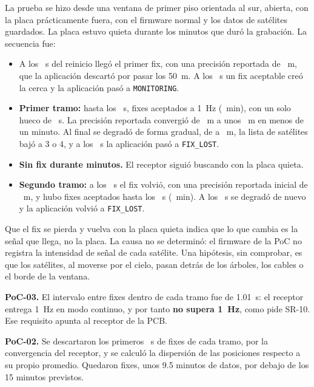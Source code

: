 La prueba se hizo desde una ventana de primer piso orientada al sur, abierta, con la placa prácticamente
fuera, con el firmware normal y los datos de satélites guardados. La placa estuvo quieta durante los
\dStaticRecordingMinutes{} minutos que duró la grabación. La secuencia fue:

\begin{itemize}
  \item A los \dStaticFirstFixS~s del reinicio llegó el primer fix, con una precisión reportada de
        \dStaticFirstFixAcc~m, que la aplicación descartó por pasar los 50~m. A los \dStaticFenceS~s un
        fix aceptable creó la cerca y la aplicación pasó a \texttt{MONITORING}.
  \item \textbf{Primer tramo:} hasta los \dStaticRunOneEndS~s, \dStaticRunOneFixes{} fixes aceptados a 1~Hz
        (\dStaticRunOneMinutes~min), con un solo hueco de \dStaticMaxGapS~s. La precisión reportada
        convergió de \dStaticAccStart~m a unos \dStaticAccConverged~m en menos de un minuto. Al final se
        degradó de forma gradual, de \dStaticTailAccFrom{} a \dStaticTailAccTo~m, la lista de satélites bajó a
        3 o 4, y a los \dStaticLostFirstS~s la aplicación pasó a \texttt{FIX\_LOST}.
  \item \textbf{Sin fix durante \dStaticGapMinutes{} minutos.} El receptor siguió buscando con la placa quieta.
  \item \textbf{Segundo tramo:} a los \dStaticRunTwoStartS~s el fix volvió, con una precisión reportada
        inicial de \dStaticRunTwoFirstAcc~m, y hubo \dStaticRunTwoFixes{} fixes aceptados hasta los
        \dStaticRunTwoEndS~s (\dStaticRunTwoMinutes~min). A los \dStaticLostSecondS~s se degradó de nuevo y la
        aplicación volvió a \texttt{FIX\_LOST}.
\end{itemize}

Que el fix se pierda y vuelva con la placa quieta indica que lo que cambia es la señal que llega, no la
placa. La causa no se determinó: el firmware de la PoC no registra la intensidad de señal de cada satélite.
Una hipótesis, sin comprobar, es que los satélites, al moverse por el cielo, pasan detrás de los árboles, los
cables o el borde de la ventana.

\textbf{PoC-03.} El intervalo entre fixes dentro de cada tramo fue de 1.01~s: el receptor entrega 1~Hz en modo
continuo, y por tanto \textbf{no supera 1~Hz}, como pide SR-10. Ese requisito apunta al receptor de la PCB.

\textbf{PoC-02.} Se descartaron los primeros \dStaticSkipS~s de fixes de cada tramo, por la convergencia del
receptor, y se calculó la dispersión de las posiciones respecto a su propio promedio. Quedaron
\dStaticBothUsed{} fixes, unos 9.5 minutos de datos, por debajo de los 15 minutos previstos.

